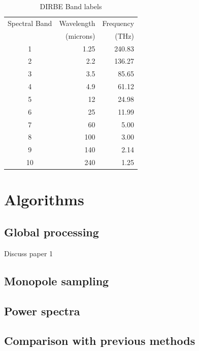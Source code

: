 \documentclass{aa}
\begin{document}
 \begin{table}
\caption{DIRBE Band labels}              %
\label{table:1}      %
\centering                                      %
\begin{tabular}{c r r}          %
\hline\hline                        %
Spectral Band & Wavelength 
	& Frequency \\    %
 & (microns) & (THz) \\
\hline                                   %
	1 & 1.25  & 240.83\\      %
	2 & 2.2   & 136.27\\
	3 & 3.5   & 85.65\\
	4 & 4.9   & 61.12\\
	5 & 12    & 24.98\\
	6 & 25    & 11.99\\
	7 & 60    & 5.00 \\
	8 & 100   & 3.00 \\
	9 & 140   & 2.14 \\
	10 & 240  & 1.25\\
\hline                                             %
\end{tabular}
\end{table}

\section{Algorithms}
\label{sec:algo}

\subsection{Global processing}

Discuss paper 1

\subsection{Monopole sampling}

\subsection{Power spectra}

\subsection{Comparison with previous methods}
\end{document}
